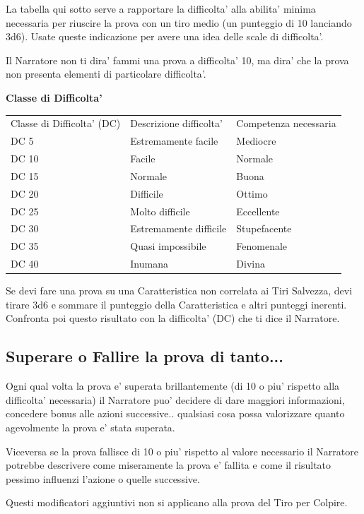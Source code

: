 \documentclass[a4paper,11pt,twoside,openany]{dndbook}
\begin{document}
\bigskip

La tabella qui sotto serve a rapportare la difficolta' alla abilita' minima necessaria per riuscire la prova con un tiro medio (un punteggio di 10 lanciando 3d6). Usate queste indicazione per avere una idea delle scale di difficolta'.

Il Narratore non ti dira' fammi una prova a difficolta' 10, ma dira' che la prova non presenta elementi di particolare difficolta'.

\bigskip

\textbf{Classe di Difficolta'}

\begin{tabular}[c]{@{}lll@{}}
\toprule 
Classe di Difficolta' (DC) & Descrizione difficolta' & Competenza necessaria\tabularnewline
DC 5 & Estremamente facile & Mediocre\tabularnewline
DC 10 & Facile & Normale\tabularnewline
DC 15 & Normale & Buona\tabularnewline
DC 20 & Difficile & Ottimo\tabularnewline
DC 25 & Molto difficile & Eccellente\tabularnewline
DC 30 & Estremamente difficile & Stupefacente\tabularnewline
DC 35 & Quasi impossibile & Fenomenale\tabularnewline
DC 40 & Inumana & Divina\tabularnewline
\bottomrule
\end{tabular}

\bigskip

Se devi fare una prova su una Caratteristica non correlata ai Tiri Salvezza, devi tirare 3d6 e sommare il punteggio della Caratteristica e altri punteggi inerenti. Confronta poi questo risultato con la difficolta' (DC) che ti dice il Narratore.

\subsection{Superare o Fallire la prova di tanto...}

Ogni qual volta la prova e' superata brillantemente (di 10 o piu' rispetto alla difficolta' necessaria) il Narratore puo' decidere di dare maggiori informazioni, concedere bonus alle azioni successive.. qualsiasi cosa possa valorizzare quanto agevolmente la prova e' stata superata.

Viceversa se la prova fallisce di 10 o piu' rispetto al valore necessario il Narratore potrebbe descrivere come miseramente la prova e' fallita e come il risultato pessimo influenzi l'azione o quelle successive.

Questi modificatori aggiuntivi non si applicano alla prova del Tiro per Colpire.
\end{document}
